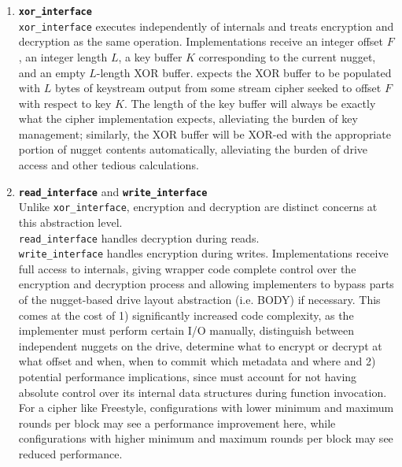 \begin{enumerate}
   \item \textbf{\texttt{xor\_interface}}\\\texttt{xor\_interface} executes
   independently of \sys{} internals and treats encryption and decryption
   as the same operation. Implementations receive an integer offset $F$, an
   integer length $L$, a key buffer $K$ corresponding to the current nugget, and
   an empty $L$-length XOR buffer. \sys{} expects the XOR buffer to be
   populated with $L$ bytes of keystream output from some stream cipher seeked
   to offset $F$ with respect to key $K$. The length of the key buffer will
   always be exactly what the cipher implementation expects, alleviating the
   burden of key management; similarly, the XOR buffer will be XOR-ed with the
   appropriate portion of nugget contents automatically, alleviating the burden
   of drive access and other tedious calculations. \\
 \item \textbf{\texttt{read\_interface}} and
   \textbf{\texttt{write\_interface}}\\
   Unlike \texttt{xor\_interface}, encryption and decryption are
   distinct concerns at this abstraction level.
   \\\texttt{read\_interface} handles decryption during reads.
   \\\texttt{write\_interface} handles encryption during writes.
   Implementations receive full access to \sys{} internals,
   giving wrapper code complete control over the encryption and
   decryption process and allowing implementers to bypass parts of the
   nugget-based drive layout abstraction (i.e. BODY) if necessary.
   This comes at the cost of 1) significantly increased code
   complexity, as the implementer 
   must perform certain I/O manually, distinguish between independent
   nuggets on the drive, determine what to encrypt or decrypt at what
   offset and when, when to commit which metadata and where and 2)
   potential performance implications, since \sys{} must account
   for not having absolute control over its internal data structures
   during function invocation. For a cipher like Freestyle,
   configurations with lower minimum and maximum rounds per block may
   see a performance improvement here, while configurations with
   higher minimum and maximum rounds per block may see reduced
   performance.
\end{enumerate}


